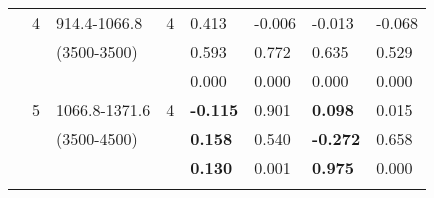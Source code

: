 \begin{table}[p]
\begin{tabular}{cclcllll}
                                                               & 4                                                              & 914.4-1066.8                                                         & 4                                                                     & 0.413                                      & -0.006                                           & -0.013                                              & -0.068  \\   
                                                               &                                                                 & (3500-3500)                                                           &                                                                        & 0.593                                      & 0.772                                            & 0.635                                               & 0.529  \\ 
                                                               &                                                                 &                                                                                &                                                                        & 0.000                                      & 0.000                                            & 0.000                                               & 0.000  \\ \cline{5-8}\noalign{\smallskip}
                                                               & 5                                                              & 1066.8-1371.6                                                       & 4                                                                     & \textbf{-0.115 }                     & 0.901                                            & \textbf{0.098 }                               & 0.015  \\ 
                                                               &                                                                 & (3500-4500)                                                           &                                                                        & \textbf{0.158 }                       & 0.540                                            & \textbf{-0.272 }                             & 0.658  \\ 
                                                               &                                                                 &                                                                                &                                                                        & \textbf{0.130 }                       & 0.001                                            & \textbf{0.975 }                               & 0.000  \\ \cline{5-8}\noalign{\smallskip}

\end{tabular}
\end{table}
